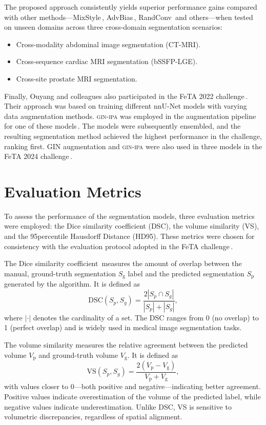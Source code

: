 The proposed approach consistently yields superior performance gains compared with other methods---MixStyle\,\cite{Zhou2021}, AdvBias\,\cite{Chen2020}, RandConv\,\cite{Xu2021} and others---when tested on unseen domains across three cross-domain segmentation scenarios:
\begin{itemize}
    \item Cross-modality abdominal image segmentation (CT-MRI).
    \item Cross-sequence cardiac MRI segmentation (bSSFP-LGE).
    \item Cross-site prostate MRI segmentation.
\end{itemize}

Finally, Ouyang and colleagues also participated in the FeTA 2022 challenge\,\cite{FeTA2022_review}. Their approach was based on training different nnU-Net models with varying data augmentation methods. \textsc{gin-ipa} was employed in the augmentation pipeline for one of these models\,\cite{FeTA2022_top}. The models were subsequently ensembled, and the resulting segmentation method achieved the highest performance in the challenge, ranking first. GIN augmentation and \textsc{gin-ipa} were also used in three models in the FeTA 2024 challenge\,\cite{FeTA2024_review}.

\section{Evaluation Metrics}
To assess the performance of the segmentation models, three evaluation metrics were employed: the Dice similarity coefficient (DSC), the volume similarity (VS), and the 95\th percentile Hausdorff Distance (HD95). These metrics were chosen for consistency with the evaluation protocol adopted in the FeTA challenge\,\cite{FeTA2021_review}.

The Dice similarity coefficient\,\cite{Dice1945,FeTA2021_review} measures the amount of overlap between the manual, ground-truth segmentation $S_\text{g}$ label and the predicted segmentation $S_\text{p}$ generated by the algorithm. It is defined as
\begin{equation}
    \text{DSC}(S_p, S_g) = \frac{2 |S_p \cap S_g|}{|S_p| + |S_g|},
\end{equation}
where $|\cdot|$ denotes the cardinality of a set. The DSC ranges from \num{0} (no overlap) to \num{1} (perfect overlap) and is widely used in medical image segmentation tasks.

The volume similarity measures the relative agreement between the predicted volume $V_\text{p}$ and ground-truth volume $V_\text{g}$. It is defined as
\begin{equation}
    \text{VS}(S_p, S_g) = \frac{2(V_\text{p} - V_\text{g})}{V_\text{p} + V_\text{g}},
\end{equation}
with values closer to \num{0}---both positive and negative---indicating better agreement. Positive values indicate overestimation of the volume of the predicted label, while negative values indicate underestimation. Unlike DSC, VS is sensitive to volumetric discrepancies, regardless of spatial alignment.

